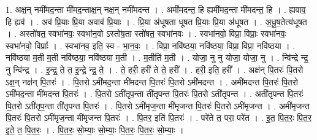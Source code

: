 \documentclass[17pt]{extarticle}
\begin{document}
1. अक्ष॒न् नमी॑मद॒न्ता मी॑मद॒न्ताक्ष॒न् नक्ष॒न् नमी॑मदन्त । . अमी॑मदन्त॒ हि ह्यमी॑मद॒न्ता मी॑मदन्त॒ हि । . ह्यवाव॒ हि ह्यव॑ । . अव॑ प्रि॒याः प्रि॒या अवाव॑ प्रि॒याः । . प्रि॒या अ॑धूषता धूषत प्रि॒याः प्रि॒या अ॑धूषत । . अ॒धू॒ष॒तेत्य॑धूषत । . अस्तो॑षत॒ स्वभा॑नवः॒ स्वभा॑न॒वो ऽस्तो॑ष॒ता स्तो॑षत॒ स्वभा॑नवः । . स्वभा॑नवो॒ विप्रा॒ विप्राः॒ स्वभा॑नवः॒ स्वभा॑नवो॒ विप्राः᳚ । . स्वभा॑नव॒ इति॒ स्व - भा॒न॒वः॒ । . विप्रा॒ नवि॑ष्ठया॒ नवि॑ष्ठया॒ विप्रा॒ विप्रा॒ नवि॑ष्ठया । . नवि॑ष्ठया म॒ती म॒ती नवि॑ष्ठया॒ नवि॑ष्ठया म॒ती । . म॒तीति॑ म॒ती । . योजा॒ नु नु योजा॒ योजा॒ नु । . न्वि॑न्द्रे न्द्र॒ नु न्वि॑न्द्र । . इ॒न्द्र॒ ते॒ त॒ इ॒न्द्रे॒ न्द्र॒ ते॒ । . ते॒ हरी॒ हरी॑ ते ते॒ हरी᳚ । . हरी॒ इति॒ हरी᳚ । . अक्ष॑न् पि॒तरः॑ पि॒तरो ऽक्ष॒न् नक्ष॑न् पि॒तरः॑ । . पि॒तरो ऽमी॑मद॒न्ता मी॑मदन्त पि॒तरः॑ पि॒तरो ऽमी॑मदन्त । . अमी॑मदन्त पि॒तरः॑ पि॒तरो ऽमी॑मद॒न्ता मी॑मदन्त पि॒तरः॑ । . पि॒तरो ऽती॑तृप॒न्ता ती॑तृपन्त पि॒तरः॑ पि॒तरो ऽती॑तृपन्त । . अती॑तृपन्त पि॒तरः॑ पि॒तरो ऽती॑तृप॒न्ता ती॑तृपन्त पि॒तरः॑ । . पि॒तरो ऽमी॑मृज॒न्ता मी॑मृजन्त पि॒तरः॑ पि॒तरो ऽमी॑मृजन्त । . अमी॑मृजन्त पि॒तरः॑ पि॒तरो ऽमी॑मृज॒न्ता मी॑मृजन्त पि॒तरः॑ । . पि॒तर॒ इति॑ पि॒तरः॑ । . परे॑ते त॒ परा॒ परे॑त । . इ॒त॒ पि॒त॒रः॒ पि॒त॒र॒ इ॒ते॒ त॒ पि॒त॒रः॒ । . पि॒त॒रः॒ सो॒म्याः॒ सो॒म्याः॒ पि॒त॒रः॒ पि॒त॒रः॒ सो॒म्याः॒ । \newline
\end{document}
